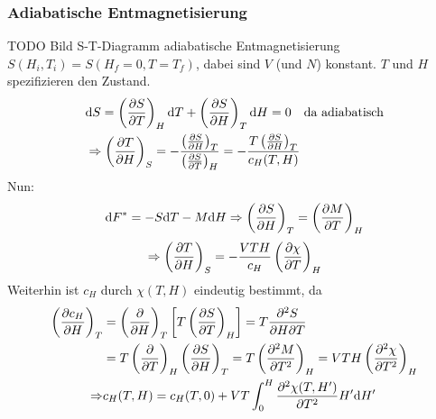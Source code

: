 \subsubsection{Adiabatische Entmagnetisierung}
TODO Bild S-T-Diagramm adiabatische Entmagnetisierung \\ %
$S(H_i, T_i) = S(H_f = 0, T = T_f)$, dabei sind $V$ (und $N$) konstant. $T$ und $H$ spezifizieren den Zustand.
\begin{equation}
    \begin{split}
        & \mathrm{d} S = \left( \frac{\partial S}{\partial T} \right)_{H} \mathrm{d} T + \left( \frac{\partial S}{\partial H} \right)_{T} \mathrm{d} H = 0 \quad \text{da adiabatisch}  \\
        & \Rightarrow \left( \frac{\partial T}{\partial H} \right)_{S} = - \frac{\left( \frac{\partial S}{\partial H} \right)_{T}}{\left( \frac{\partial S}{\partial T} \right)_{H}} = - \frac{T \left( \frac{\partial S}{\partial H} \right)_{T} }{c_H (T, H)}
    \end{split}
\end{equation}
Nun:
\begin{equation}
    \mathrm{d} F^* = - S \mathrm{d} T - M \mathrm{d} H \Rightarrow \left( \frac{\partial S}{\partial H} \right)_{T} = \left( \frac{\partial M}{\partial T} \right)_{H}
\end{equation}
\begin{equation}
    \Rightarrow \left( \frac{\partial T}{\partial H} \right)_{S} = - \frac{V T H}{c_H} \left( \frac{\partial \chi}{\partial T} \right)_{H}
\end{equation}
Weiterhin ist $c_H$ durch $\chi(T, H)$ eindeutig bestimmt, da
\begin{equation}
    \begin{split}
        \left( \frac{\partial c_H}{\partial H} \right)_{T} &= \left( \frac{\partial }{\partial H} \right)_{T} \left[ T \left( \frac{\partial S}{\partial T} \right)_{H} \right] = T \frac{\partial^2 S}{\partial H \partial T} \\
        &= T \left( \frac{\partial }{\partial T} \right)_{H} \left( \frac{\partial S}{\partial H} \right)_{T} = T \left( \frac{\partial^2 M}{\partial T^2} \right)_H	= V T H \left( \frac{\partial^2 \chi}{\partial T^2} \right)_H \\
       \Rightarrow & c_H(T, H) = c_H (T, 0) + V T \int_{0}^{H} \frac{\partial^2  \chi(T, H')}{\partial T^2} H' \mathrm{d} H'
    \end{split}
\end{equation}

